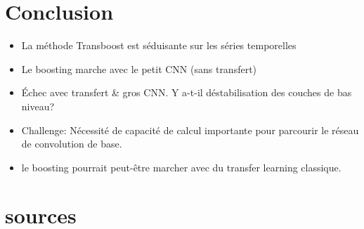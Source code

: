 \documentclass{beamer}
\begin{document}
\section{Conclusion}
	\begin{frame}
    \begin{itemize}
    	\item La méthode Transboost est séduisante sur les séries temporelles 
        \item Le boosting marche avec le petit CNN (sans transfert)
		\item Échec avec transfert \& gros CNN. Y a-t-il déstabilisation des couches de bas niveau?
        \item Challenge: Nécessité de capacité de calcul importante pour parcourir le réseau de convolution de base.
        \item le boosting pourrait peut-être marcher avec du transfer learning classique.
    \end{itemize}
	\end{frame}
    
\section*{sources}
\end{document}
